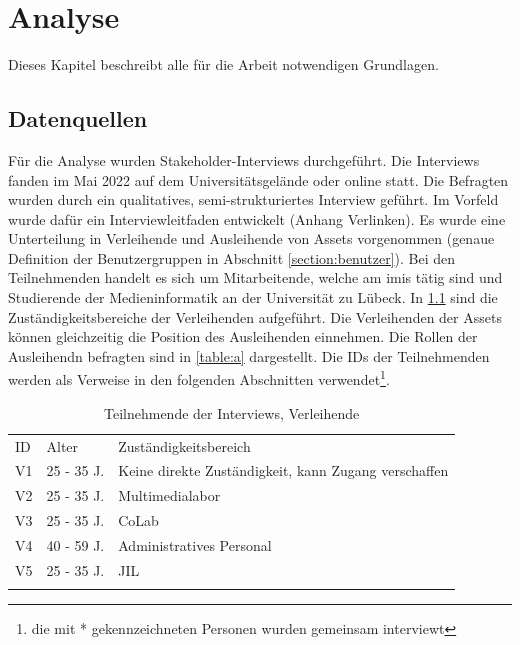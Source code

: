 
\chapter{Analyse}
\label{chapter-analyse}

Dieses Kapitel beschreibt alle für die Arbeit notwendigen Grundlagen.

\section{Datenquellen}
\label{section:daten}
Für die Analyse wurden Stakeholder-Interviews durchgeführt. Die Interviews fanden im Mai 2022
auf dem Universitätsgelände oder online statt. Die Befragten wurden durch ein qualitatives,
semi-strukturiertes Interview geführt. Im Vorfeld wurde dafür ein Interviewleitfaden entwickelt
(Anhang Verlinken). Es wurde eine Unterteilung in Verleihende und Ausleihende von Assets vorgenommen
(genaue Definition der Benutzergruppen in Abschnitt
\ref{section:benutzer}). Bei den Teilnehmenden handelt es sich um Mitarbeitende, welche am \ac{imis}
tätig sind und Studierende der Medieninformatik an der Universität zu Lübeck. In \ref{table:v} sind die Zuständigkeitsbereiche der
Verleihenden aufgeführt. Die Verleihenden der Assets können gleichzeitig die Position des
Ausleihenden einnehmen. 
Die Rollen der Ausleihendn befragten sind in \ref{table:a} dargestellt. Die IDs
der Teilnehmenden werden als Verweise in den folgenden Abschnitten verwendet\footnote{die mit * gekennzeichneten Personen wurden gemeinsam interviewt}.

\begin{table}[h]
    \centering
    \caption{Teilnehmende der Interviews, Verleihende}
    \begin{tabular}{lll}
        \arrayrulecolor{maincolor}\hline
        \sffamily\color{maincolor}ID & \sffamily\color{maincolor}Alter & \sffamily\color{maincolor}Zuständigkeitsbereich \\
        \arrayrulecolor{maincolor}\hline
            V1 & 25 - 35 J. & Keine direkte Zuständigkeit, kann Zugang verschaffen\\
            V2 & 25 - 35 J. & Multimedialabor\\
            V3 & 25 - 35 J. & CoLab\\
            V4 & 40 - 59 J. & Administratives Personal\\
            V5 & 25 - 35 J. & JIL\\
            \arrayrulecolor{maincolor}\hline
    \end{tabular}  
    \label{table:v}
\end{table}

